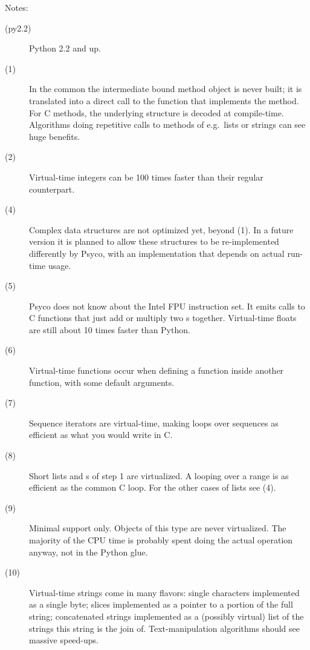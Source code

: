 \documentclass{manual}
\begin{document}
\noindent
Notes:
%
\begin{description}

\item[(py2.2)]
  Python 2.2 and up.
  
\item[(1)]
  In the common  the intermediate bound method object is never built; it is translated into a direct call to the function that implements the method.  For C methods, the underlying  structure is decoded at compile-time.  Algorithms doing repetitive calls to methods of e.g.\ lists or strings can see huge benefits.
  
\item[(2)]
  Virtual-time integers can be 100 times faster than their regular counterpart.

\item[(4)]
  Complex data structures are not optimized yet, beyond (1).  In a future version it is planned to allow these structures to be re-implemented differently by Psyco, with an implementation that depends on actual run-time usage.
  
\item[(5)]
  Psyco does not know about the Intel FPU instruction set.  It emits calls to C functions that just add or multiply two s together.  Virtual-time floats are still about 10 times faster than Python.
  
\item[(6)]
  Virtual-time functions occur when defining a function inside another function, with some default arguments.
  
\item[(7)]
  Sequence iterators are virtual-time, making  loops over sequences as efficient as what you would write in C.

\item[(8)]
  Short lists and s of step 1 are virtualized.  A  looping over a range is as efficient as the common C  loop.  For the other cases of lists see (4).

\item[(9)]
  Minimal support only.  Objects of this type are never virtualized.  The majority of the CPU time is probably spent doing the actual operation anyway, not in the Python glue.

\item[(10)]
  Virtual-time strings come in many flavors: single characters implemented as a single byte; slices implemented as a pointer to a portion of the full string; concatenated strings implemented as a (possibly virtual) list of the strings this string is the join of.  Text-manipulation algorithms should see massive speed-ups.
  

\end{description}
\end{document}
